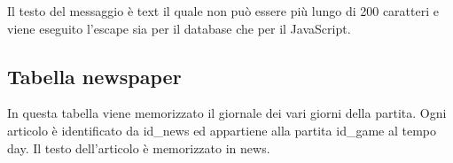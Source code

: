\documentclass[10pt,a4paper]{article}
\begin{document}
Il testo del messaggio è \textsf{text} il quale non può essere più lungo di 200 caratteri e viene eseguito l'escape sia per il database che per il JavaScript.

\subsection{Tabella newspaper}
In questa tabella viene memorizzato il giornale dei vari giorni della partita. Ogni articolo è identificato da \textsf{id\_news} ed appartiene alla partita \textsf{id\_game} al tempo \textsf{day}. Il testo dell'articolo è memorizzato in \textsf{news}.

\newpage
\tableofcontents
\end{document}
